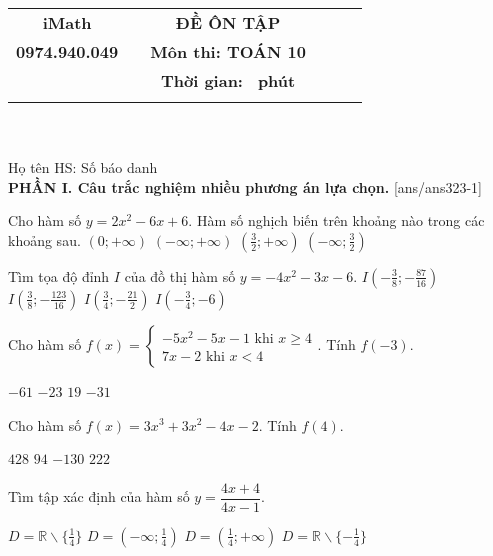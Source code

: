 \documentclass[12pt,a4paper]{article}
\newcommand{\tenso}{iMath}
\newcommand{\tentruong}{0974.940.049}
\newcommand{\tenkythi}{ĐỀ ÔN TẬP}
\newcommand{\tenmonthi}{Môn thi: TOÁN 10}
\newcommand{\thoigian}{}
\newcommand{\tieude}[1]{
   \begin{tabular}{cm{3cm}cm{3cm}cm{3cm}}
    {\bf \tenso} & & {\bf \tenkythi} \\
    {\bf \tentruong} & & {\bf \tenmonthi}\\
    && {\bf Thời gian: \bf \thoigian \, phút}\\
    && { \fbox{\bf Mã đề: #1}}
   \end{tabular}\\\\
    
   {Họ tên HS: \dotfill Số báo danh \dotfill}\\
}
\newcommand{\chantrang}[2]{\rfoot{Trang \thepage $-$ Mã đề #2}}
\begin{document}


\tieude{323}
\chantrang{\pageref{LastPage}}{323}
\setcounter{page}{1}
{\bf PHẦN I. Câu trắc nghiệm nhiều phương án lựa chọn.}
\setcounter{ex}{0}
[ans/ans323-1]
\begin{ex}
 Cho hàm số $y=2 x^{2} - 6 x + 6 $. Hàm số nghịch biến trên khoảng nào trong các khoảng sau.
\choice
{ $\left(0;+\infty\right)$ }
   { $\left(-\infty; +\infty\right)$ }
     { $\left(\frac{3}{2} ; +\infty\right)$ }
    { \True $\left(-\infty; \frac{3}{2}\right)$ }
\end{ex}

\begin{ex}
 Tìm tọa độ đỉnh ${I}$ của đồ thị hàm số $y=- 4 x^{2} - 3 x - 6$.
\choice
{ \True ${I\left(- \frac{3}{8};- \frac{87}{16}\right)}$ }
   { ${I\left(\frac{3}{8};- \frac{123}{16}\right)}$ }
     { ${I\left(\frac{3}{4};- \frac{21}{2}\right)}$ }
    { ${I\left(- \frac{3}{4};-6\right)}$ }
\end{ex}

\begin{ex}
 Cho hàm số $f(x)=\left\{ \begin{array}{l} 
     - 5 x^{2} - 5 x - 1 \text{ khi } x \ge 4  \\ 
     7 x - 2 \text{          khi  } x < 4  
     \end{array} \right.$. Tính $f(-3)$.

 
\choice
{ $ {-61}$ }
   { \True ${ -23 }$ }
     { $ {19}$ }
    { $ {-31 }$ }
\end{ex}

\begin{ex}
 Cho hàm số $f(x)=3 x^{3} + 3 x^{2} - 4 x - 2$. Tính $f(4)$.

 
\choice
{ $ {428 }$ }
   { $ {94}$ }
     { $ {-130}$ }
    { \True ${ 222 }$ }
\end{ex}

\begin{ex}
 Tìm tập xác định của hàm số $y=\dfrac{4 x + 4}{4 x - 1}$.
 
\choice
{ \True $D=\mathbb{R} \backslash \{ \frac{1}{4} \}$ }
   { $D=\left( -\infty ; \frac{1}{4} \right)$ }
     { $D=\left( \frac{1}{4} ; +\infty \right)$ }
    { $D=\mathbb{R} \backslash \{ - \frac{1}{4} \}$ }
\end{ex}
\end{document}
